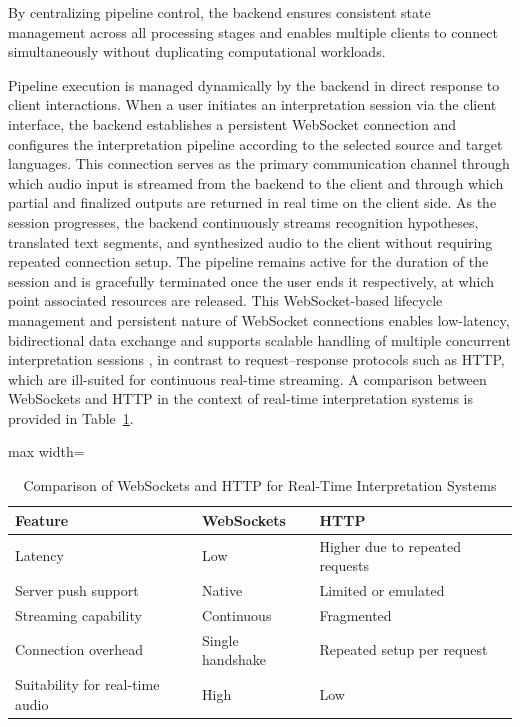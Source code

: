 By centralizing pipeline control, the backend ensures consistent state management across all processing stages and enables multiple clients to connect simultaneously without duplicating computational workloads.

Pipeline execution is managed dynamically by the backend in direct response to client interactions. When a user initiates an interpretation session via the client interface, the backend establishes a persistent WebSocket connection and configures the interpretation pipeline according to the selected source and target languages. This connection serves as the primary communication channel through which audio input is streamed from the backend to the client and through which partial and finalized outputs are returned in real time on the client side. As the session progresses, the backend continuously streams recognition hypotheses, translated text segments, and synthesized audio to the client without requiring repeated connection setup. The pipeline remains active for the duration of the session and is gracefully terminated once the user ends it respectively, at which point associated resources are released. This WebSocket-based lifecycle management and persistent nature of WebSocket connections enables low-latency, bidirectional data exchange and supports scalable handling of multiple concurrent interpretation sessions \cite{sathya2025realtime}, in contrast to request–response protocols such as HTTP, which are ill-suited for continuous real-time streaming. A comparison between WebSockets and HTTP in the context of real-time interpretation systems is provided in Table~\ref{tab:websocket_vs_http}.

\begin{table}[!htbp]
  \centering
  \caption[Comparison of WebSockets \& HTTP for real-time communication]{Comparison of WebSockets and HTTP for Real-Time Interpretation Systems}
      \label{tab:websocket_vs_http}
  \begin{adjustbox}{max width=\textwidth}
    \begin{tabular}{p{6cm} p{4cm} p{6cm}}
      \toprule
      \textbf{Feature} & \textbf{WebSockets} & \textbf{HTTP} \\
      \midrule
      Latency & Low & Higher due to repeated requests \\
      \midrule
      Server push support & Native & Limited or emulated \\
      \midrule
      Streaming capability & Continuous & Fragmented \\
      \midrule
      Connection overhead & Single handshake & Repeated setup per request \\
      \midrule
      Suitability for real-time audio & High & Low \\
      \bottomrule
    \end{tabular}
  \end{adjustbox}
\end{table}


